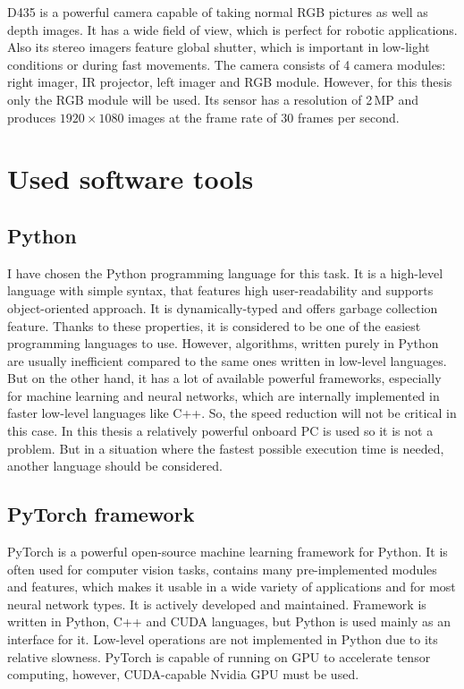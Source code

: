 D435 is a powerful camera capable of taking normal RGB pictures as well as depth images. It has a wide field of view, which is perfect for robotic applications. Also its stereo imagers feature global shutter, which is important in low-light conditions or during fast movements. The camera consists of 4 camera modules: right imager, IR projector, left imager and RGB module. However, for this thesis only the RGB module will be used. Its sensor has a resolution of 2\,MP and produces $1920\times1080$ images at the frame rate of 30 frames per second.


\section{Used software tools}

\subsection{Python}

I have chosen the Python programming language for this task. It is a high-level language with simple syntax, that features high user-readability and supports object-oriented approach. It is dynamically-typed and offers garbage collection feature. Thanks to these properties, it is considered to be one of the easiest programming languages to use. However, algorithms, written purely in Python are usually inefficient compared to the same ones written in low-level languages. But on the other hand, it has a lot of available powerful frameworks, especially for machine learning and neural networks, which are internally implemented in faster low-level languages like C++. So, the speed reduction will not be critical in this case. In this thesis a relatively powerful onboard PC is used so it is not a problem. But in a situation where the fastest possible execution time is needed, another language should be considered. 

\subsection{PyTorch framework}

PyTorch is a powerful open-source machine learning framework for Python. It is often used for computer vision tasks, contains many pre-implemented modules and features, which makes it usable in a wide variety of applications and for most neural network types. It is actively developed and maintained. Framework is written in Python, C++ and CUDA languages, but Python is used mainly as an interface for it. Low-level operations are not implemented in Python due to its relative slowness. PyTorch is capable of running on GPU to accelerate tensor computing, however, CUDA-capable Nvidia GPU must be used. 


